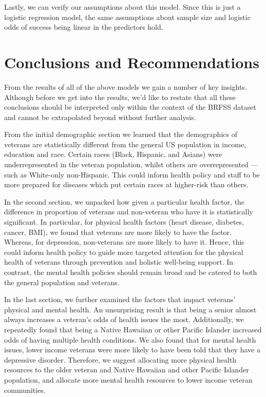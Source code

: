 \documentclass[
  10pt,
  letterpaper,
  DIV=11,
  numbers=noendperiod]{scrartcl}
\begin{document}
Lastly, we can verify our assumptions about this model. Since this is
just a logistic regression model, the same assumptions about sample size
and logistic odds of success being linear in the predictors hold.

\section{Conclusions and
Recommendations}\label{conclusions-and-recommendations}

From the results of all of the above models we gain a number of key
insights. Although before we get into the results, we'd like to restate
that all these conclusions should be interpreted only within the context
of the BRFSS dataset and cannot be extrapolated beyond without further
analysis.

From the initial demographic section we learned that the demographics of
veterans are statistically different from the general US population in
income, education and race. Certain races (Black, Hispanic, and Asians)
were underrepresented in the veteran population, whilst others are
overrepresented --- such as White-only non-Hispanic. This could inform
health policy and staff to be more prepared for diseases which put
certain races at higher-risk than others.

In the second section, we unpacked how given a particular health factor,
the difference in proportion of veterans and non-veteran who have it is
statistically significant. In particular, for physical health factors
(heart disease, diabetes, cancer, BMI), we found that veterans are more
likely to have the factor. Whereas, for depression, non-veterans are
more likely to have it. Hence, this could inform health policy to guide
more targeted attention for the physical health of veterans through
prevention and holistic well-being support. In contrast, the mental
health policies should remain broad and be catered to both the general
population and veterans.

In the last section, we further examined the factors that impact
veterans' physical and mental health. An unsurprising result is that
being a senior almost always increases a veteran's odds of health issues
the most. Additionally, we repeatedly found that being a Native Hawaiian
or other Pacific Islander increased odds of having multiple health
conditions. We also found that for mental health issues, lower income
veterans were more likely to have been told that they have a depressive
disorder. Therefore, we suggest allocating more physical health
resources to the older veteran and Native Hawaiian and other Pacific
Islander population, and allocate more mental health resources to lower
income veteran communities.
\end{document}
